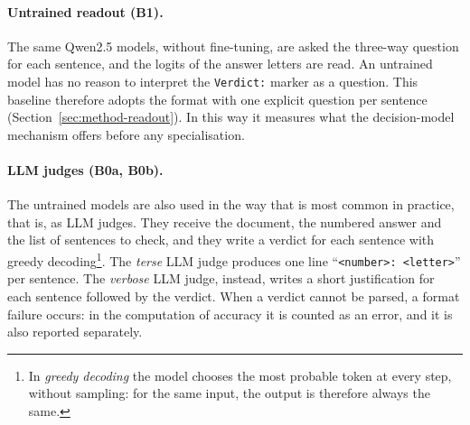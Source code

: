 \paragraph{Untrained readout (B1).} The same Qwen2.5 models, without fine-tuning, are asked the three-way question for
each sentence, and the logits of the answer letters are read. An untrained model has no reason to interpret the
\texttt{Verdict:} marker as a question. This baseline therefore adopts the format with one explicit question per
sentence (Section~\ref{sec:method-readout}). In this way it measures what the decision-model mechanism offers before any
specialisation.

\paragraph{LLM judges (B0a, B0b).} The untrained models are also used in the way that is most common in
practice, that is, as LLM judges. They receive the document, the numbered answer and the list of sentences to check, and
they write a verdict for each sentence with greedy decoding\footnote{In \emph{greedy decoding} the model chooses the
most probable token at every step, without sampling: for the same input, the output is therefore always the same.}. The
\emph{terse} LLM judge produces one line ``\texttt{<number>: <letter>}'' per sentence. The \emph{verbose} LLM judge, instead,
writes a short justification for each sentence followed by the verdict. When a verdict cannot be parsed, a format
failure occurs: in the computation of accuracy it is counted as an error, and it is also reported separately.

